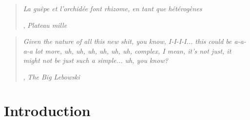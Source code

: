 \documentclass[]{article}
\begin{document}
{
\singlespacing
\small

\begin{quote}
\begin{flushright}
\textit{La guêpe et l'orchidée font rhizome, en tant que hétérogènes}\end{flushright}


\begin{flushright}
, \textit{Plateau mille} \end{flushright}

\end{quote}

\vspace{10mm}

\begin{quote}
    \begin{flushright}
    \textit{Given the nature of all this new shit, you know, I-I-I-I... this could be a-a-a-a lot more, uh, uh, uh, uh, uh, uh, complex, I mean, it's not just, it might not be just such a simple... uh, you know?} \end{flushright}

    \begin{flushright}
        , \textit{The Big Lebowski } 
    \end{flushright}
\end{quote}
}

\vspace{30mm}

{
\hypersetup{linkcolor=black}
\setcounter{tocdepth}{3}
\normalfont
\tableofcontents
}
\pagebreak



%
%
%
\hypertarget{introduction}{%
\section{Introduction}\label{introduction}}
\end{document}
